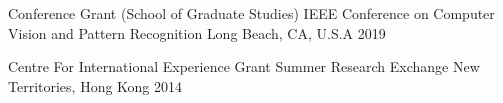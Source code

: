



\begin{cvhonors}

  \cvhonor
    {Conference Grant (School of Graduate Studies)} %
    {IEEE Conference on Computer Vision and Pattern Recognition} %
    {Long Beach, CA, U.S.A} %
    {2019} %

  \cvhonor
    {Centre For International Experience Grant} %
    {Summer Research Exchange} %
    {New Territories, Hong Kong} %
    {2014} %
		
\end{cvhonors}





